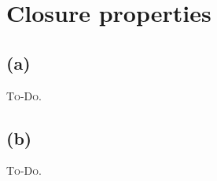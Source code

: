 

\setcounter{section}{1}


\section{Closure properties}

\subsection{(a)}
\textsc{To-Do.}

\subsection{(b)}
\textsc{To-Do.}


